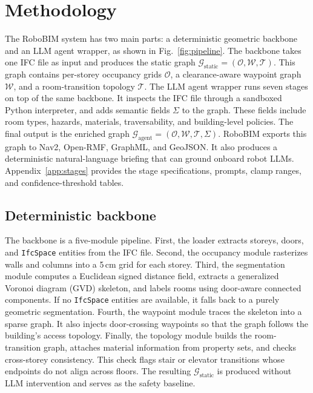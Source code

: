 \documentclass[a4paper, 10pt, conference]{ieeeconf}
\begin{document}
\section{Methodology}
\label{sec:method}

The RoboBIM system has two main parts: a deterministic geometric backbone and an LLM agent wrapper, as shown in Fig.~\ref{fig:pipeline}. The backbone takes one IFC file as input and produces the static graph $\mathcal{G}_{\text{static}}=(\mathcal{O},\mathcal{W},\mathcal{T})$. This graph contains per-storey occupancy grids $\mathcal{O}$, a clearance-aware waypoint graph $\mathcal{W}$, and a room-transition topology $\mathcal{T}$. The LLM agent wrapper runs seven stages on top of the same backbone. It inspects the IFC file through a sandboxed Python interpreter, and adds semantic fields $\Sigma$ to the graph. These fields include room types, hazards, materials, traversability, and building-level policies. The final output is the enriched graph $\mathcal{G}_{\text{agent}}=(\mathcal{O},\mathcal{W},\mathcal{T},\Sigma)$. RoboBIM exports this graph to Nav2, Open-RMF, GraphML, and GeoJSON. It also produces a deterministic natural-language briefing that can ground onboard robot LLMs. Appendix~\ref{app:stages} provides the stage specifications, prompts, clamp ranges, and confidence-threshold tables.

\subsection{Deterministic backbone}

The backbone is a five-module pipeline. First, the loader extracts storeys, doors, and \texttt{IfcSpace} entities from the IFC file. Second, the occupancy module rasterizes walls and columns into a 5\,cm grid for each storey. Third, the segmentation module computes a Euclidean signed distance field, extracts a generalized Voronoi diagram (GVD) skeleton, and labels rooms using door-aware connected components. If no \texttt{IfcSpace} entities are available, it falls back to a purely geometric segmentation. Fourth, the waypoint module traces the skeleton into a sparse graph. It also injects door-crossing waypoints so that the graph follows the building's access topology. Finally, the topology module builds the room-transition graph, attaches material information from property sets, and checks cross-storey consistency. This check flags stair or elevator transitions whose endpoints do not align across floors. The resulting $\mathcal{G}_{\text{static}}$ is produced without LLM intervention and serves as the safety baseline.
\end{document}
